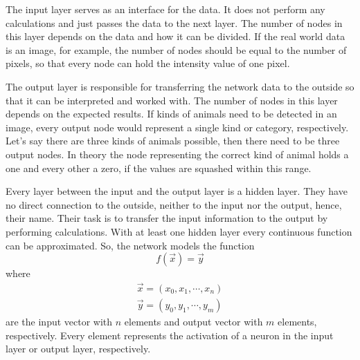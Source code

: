 The input layer serves as an interface for the data.
It does not perform any calculations and just passes the data to the next layer.
The number of nodes in this layer depends on the data and how it can be divided.
If the real world data is an image, for example, the number of nodes should be equal to the number of pixels, so that every node can hold the intensity value of one pixel.

The output layer is responsible for transferring the network data to the outside so that it can be interpreted and worked with.
The number of nodes in this layer depends on the expected results.
If kinds of animals need to be detected in an image, every output node would represent a single kind or category, respectively.
Let's say there are three kinds of animals possible, then there need to be three output nodes.
In theory the node representing the correct kind of animal holds a one and every other a zero, if the values are squashed within this range.

Every layer between the input and the output layer is a hidden layer.
They have no direct connection to the outside, neither to the input nor the output, hence, their name.
Their task is to transfer the input information to the output by performing calculations.
With at least one hidden layer every continuous function can be approximated.
So, the network models the function 
\begin{equation}
	\label{eq:multilayer-perceptron}
	f(\vec{x}) = \vec{y}
\end{equation}
where
\begin{align}
	\vec{x} = (x_0, x_1, \cdots, x_n) \\
	\vec{y} = (y_0, y_1, \cdots, y_m)
\end{align}
are the input vector with $n$ elements and output vector with $m$ elements, respectively.
Every element represents the activation of a neuron in the input layer or output layer, respectively.

